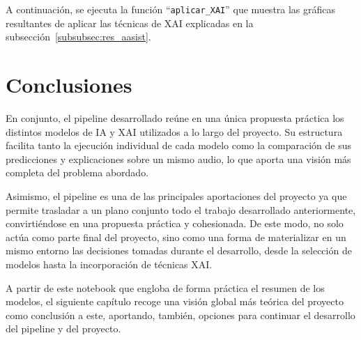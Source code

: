 A continuación, se ejecuta la función ``\texttt{aplicar\_XAI}'' que muestra las gráficas resultantes de aplicar las técnicas de XAI explicadas en la subsección~\ref{subsubsec:res_aasist}.

\section{Conclusiones}
\label{sec:conc_pipeline}

En conjunto, el pipeline desarrollado reúne en una única propuesta práctica los distintos modelos de IA y XAI utilizados a lo largo del proyecto. Su estructura facilita tanto la ejecución individual de cada modelo como la comparación de sus predicciones y explicaciones sobre un mismo audio, lo que aporta una visión más completa del problema abordado.

Asimismo, el pipeline es una de las principales aportaciones del proyecto ya que permite trasladar a un plano conjunto todo el trabajo desarrollado anteriormente, convirtiéndose en una propuesta práctica y cohesionada. De este modo, no solo actúa como parte final del proyecto, sino como una forma de materializar en un mismo entorno las decisiones tomadas durante el desarrollo, desde la selección de modelos hasta la incorporación de técnicas XAI.

A partir de este notebook que engloba de forma práctica el resumen de los modelos, el siguiente capítulo recoge una visión global más teórica del proyecto como conclusión a este, aportando, también, opciones para continuar el desarrollo del pipeline y del proyecto.